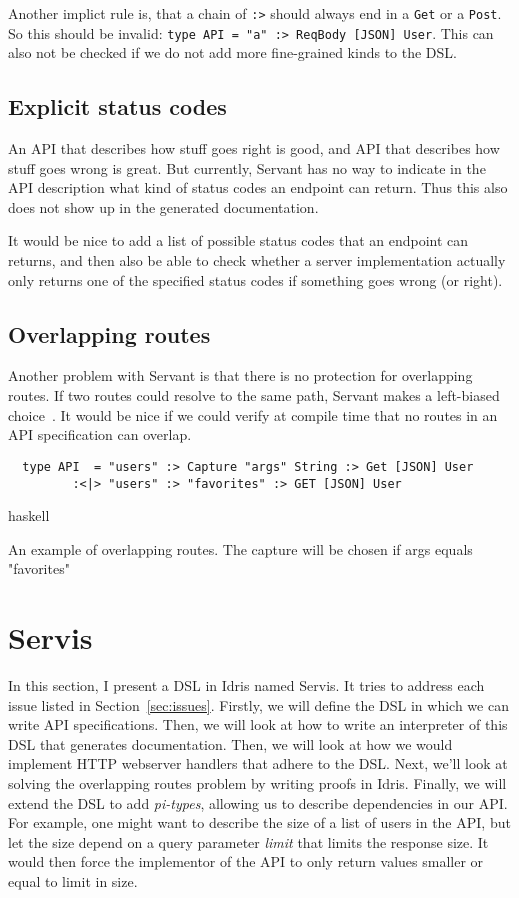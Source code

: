 \documentclass[12pt,a4paper]{article}
\begin{document}
Another implict rule is, that a chain of \texttt{:>} should always end in a \texttt{Get} or a \texttt{Post}. So this should be invalid: \texttt{type API = "a" :> ReqBody [JSON] User}.  This can also not be checked if we do not add more fine-grained kinds to the DSL.

\subsection{Explicit status codes}
An API that describes how stuff goes right is good, and API that describes how stuff goes wrong is great. But currently, Servant has no way to indicate in the API description what kind of status codes an endpoint can return. Thus this also does not show up in the generated documentation.

It would be nice to add a list of possible status codes that an endpoint can returns, and then also be able to check whether a server implementation actually only returns one of the specified status codes if something goes wrong (or right).

\subsection{Overlapping routes}
Another problem with Servant is that there is no protection for overlapping routes. If two routes could resolve to the same path, Servant makes a left-biased choice~\cite{needed}.
It would be nice if we could verify at compile time that no routes in an API specification can overlap.

\begin{listing}
\begin{verbatim}
  type API  = "users" :> Capture "args" String :> Get [JSON] User
         :<|> "users" :> "favorites" :> GET [JSON] User
\end{verbatim}{haskell}
\caption{An example of overlapping routes. The capture will be chosen if args equals "favorites"}
\end{listing}



\section{Servis}
In this section, I present a DSL in Idris named Servis. It tries to address each issue listed in Section~\ref{sec:issues}. Firstly, we will define the DSL in which we can write API specifications. Then, we will look at how to write an interpreter of this DSL that generates documentation. Then, we will look at how we would implement HTTP webserver handlers that adhere to the DSL. Next, we'll look at solving the overlapping routes problem by writing proofs in Idris.
Finally, we will extend the DSL to add \emph{pi-types}, allowing us to describe dependencies in our API\@.  For example, one might want to describe  the size of a list of users in the API, but let the size depend on a query parameter \emph{limit} that limits the response size.  It would then force the implementor of the API to only return values smaller or equal to limit in size.
\end{document}
